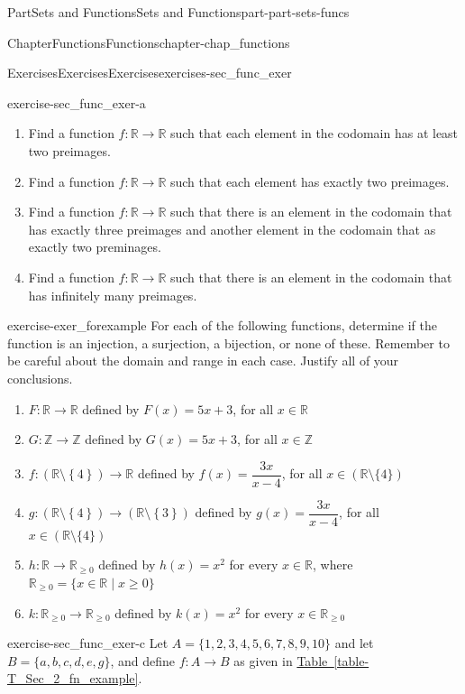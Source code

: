 \documentclass[oneside,10pt,]{book}
\newcommand{\xreffont}{\relax}
\numberwithin{equation}{chapter}
\newcommand{\Z}{\mathbb{Z}}
\newcommand{\R}{\mathbb{R}}
\begin{document}
\begin{partptx}{Part}{Sets and Functions}{}{Sets and Functions}{}{}{part-part-sets-funcs}
\begin{chapterptx}{Chapter}{Functions}{}{Functions}{}{}{chapter-chap_functions}
\begin{exercises-section}{Exercises}{Exercises}{}{Exercises}{}{}{exercises-sec_func_exer}
\begin{divisionexercise}{1}{}{}{exercise-sec_func_exer-a}
\begin{enumerate}[font=\bfseries,label=(\alph*),ref=\alph*]
\item{}Find a function \(f: \R \to \R\) such that each element in the codomain has at least two preimages.%
\item{}Find a function \(f: \R \to \R\) such that each element has exactly two preimages.%
\item{}Find a function \(f: \R \to \R\) such that there is an element in the codomain that has exactly three preimages and another element in the codomain that as exactly two preminages.%
\item{}Find a function \(f: \R \to \R\) such that there is an element in the codomain that has infinitely many preimages.%
\end{enumerate}%
\end{divisionexercise}%
\begin{divisionexercise}{2}{}{}{exercise-exer_forexample}%
For each of the following functions, determine if the function is an injection, a surjection, a bijection, or none of these. Remember to be careful about the domain and range in each case. Justify all of your conclusions.%
\begin{enumerate}[font=\bfseries,label=(\alph*),ref=\alph*]%
\item{}\(F:\mathbb{R} \to \mathbb{R}\) defined by \(F( x ) = 5x + 3\), for all \(x \in \mathbb{R}\)%
\item{}\(G:\Z \to \Z\) defined by \(G( x ) = 5x + 3\), for all \(x \in \Z\)%
\item{}\(f: ( \R \setminus \left\{ 4 \right\} ) \to \R\) defined by \(f ( x ) = \dfrac{3x}{x - 4}\), for all \(x \in \left( \R \setminus\{ 4 \} \right)\)%
\item{}\(g: ( \R \setminus \left\{ 4 \right\} ) \to ( \R \setminus \left\{ 3 \right\} )\) defined by \(g ( x ) = \dfrac{3x}{x - 4}\), for all \(x \in \left( \R \setminus \{ 4 \} \right)\)%
\item{}\(h: \R \to \R_{\geq 0}\) defined by \(h(x) = x^2\) for every \(x \in \R\), where \(\R_{\geq 0} = \{x \in \R \mid x \geq 0\}\)%
\item{}\(k: \R_{\geq 0} \to \R_{\geq 0}\) defined by \(k(x) = x^2\) for every \(x \in \R_{\geq 0}\)%
\end{enumerate}%
\end{divisionexercise}%
\begin{divisionexercise}{3}{}{}{exercise-sec_func_exer-c}%
Let \(A = \{1,2,3,4,5,6,7,8,9,10\}\) and let \(B = \{a,b,c,d,e,g\}\), and define \(f:A \to B\) as given in \hyperref[table-T_Sec_2_fn_example]{Table~{\xreffont\ref{table-T_Sec_2_fn_example}}}.%

\end{divisionexercise}
\end{exercises-section}
\end{chapterptx}
\end{partptx}
\end{document}
